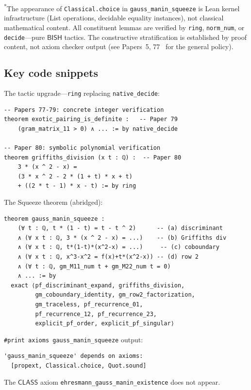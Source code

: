 \documentclass[11pt]{article}
\theoremstyle{plain}
\theoremstyle{definition}
\theoremstyle{remark}
\newcommand{\BISH}{\mathsf{BISH}}
\newcommand{\CLASS}{\mathsf{CLASS}}
\begin{document}
\noindent
\textsuperscript{*}The appearance of \texttt{Classical.choice} in
\texttt{gauss\_manin\_squeeze} is Lean kernel infrastructure
(List operations, decidable equality instances), not classical
mathematical content.  All constituent lemmas are verified by
\texttt{ring}, \texttt{norm\_num}, or \texttt{decide}---pure
$\BISH$ tactics.  The constructive stratification is established
by proof content, not axiom checker output
(see Papers~5, 77~\cite{Paper5,Paper77} for the general policy).

\subsection{Key code snippets}

The tactic upgrade---\texttt{ring} replacing \texttt{native\_decide}:

\begin{lstlisting}
-- Papers 77-79: concrete integer verification
theorem exotic_pairing_is_definite :   -- Paper 79
    (gram_matrix_11 > 0) ∧ ... := by native_decide

-- Paper 80: symbolic polynomial verification
theorem griffiths_division (x t : ℚ) :  -- Paper 80
    3 * (x ^ 2 - x) =
    (3 * x ^ 2 - 2 * (1 + t) * x + t)
    + ((2 * t - 1) * x - t) := by ring
\end{lstlisting}

The Squeeze theorem (abridged):

\begin{lstlisting}
theorem gauss_manin_squeeze :
    (∀ t : ℚ, t * (1 - t) = t - t ^ 2)      -- (a) discriminant
    ∧ (∀ x t : ℚ, 3 * (x ^ 2 - x) = ...)    -- (b) Griffiths div
    ∧ (∀ x t : ℚ, t*(1-t)*(x^2-x) = ...)     -- (c) coboundary
    ∧ (∀ x t : ℚ, x^3-x^2 = f(x)+t*(x^2-x)) -- (d) row 2
    ∧ (∀ t : ℚ, gm_M11_num t + gm_M22_num t = 0)
    ∧ ... := by
  exact ⟨pf_discriminant_expand, griffiths_division,
         gm_coboundary_identity, gm_row2_factorization,
         gm_traceless, pf_recurrence_01,
         pf_recurrence_12, pf_recurrence_23,
         explicit_pf_order, explicit_pf_singular⟩
\end{lstlisting}

\noindent
\texttt{\#print axioms gauss\_manin\_squeeze} output:
\begin{verbatim}
'gauss_manin_squeeze' depends on axioms:
  [propext, Classical.choice, Quot.sound]
\end{verbatim}
The $\CLASS$ axiom \texttt{ehresmann\_gauss\_manin\_existence} does
not appear.
\end{document}
